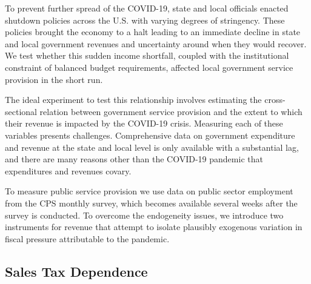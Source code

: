 To prevent further spread of the COVID-19, state and local officials enacted shutdown policies across the U.S. with varying degrees of stringency. These policies brought the economy to a halt leading to an immediate decline in state and local government revenues and uncertainty around when they would recover. We test whether this sudden income shortfall, coupled with the institutional constraint of balanced budget requirements, affected local government service provision in the short run. 

The ideal experiment to test this relationship involves estimating the cross-sectional relation between government service provision and the extent to which their revenue is impacted by the COVID-19 crisis. Measuring each of these variables presents challenges. Comprehensive data on government expenditure and revenue at the state and local level is only available with a substantial lag, and there are many reasons other than the COVID-19 pandemic that expenditures and revenues covary. 

To measure public service provision we use data on public sector employment from the CPS monthly survey, which becomes available several weeks after the survey is conducted.  To overcome the endogeneity issues, we introduce two instruments for revenue that attempt to isolate plausibly exogenous variation in fiscal pressure attributable to the pandemic.

\subsection{Sales Tax Dependence}
\label{subsec:empirics:salestax}

